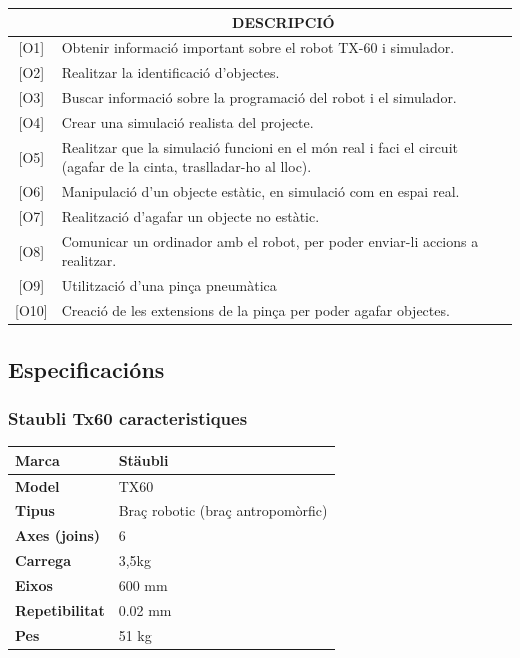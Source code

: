 ﻿\documentclass[10pt,a4paper,twocolumn,twoside]{article}
\begin{document}
\begin{table}[h]
\begin{tabular}{ | m{1.5cm} | m{6cm} | }
\hline
\rowcolor[HTML]{C0C0C0}
\multicolumn{1}{|c|}{\textbf{CODI}} 	& \multicolumn{1}{c|}{\textbf{DESCRIPCIÓ}} 									\\ \hline
\multicolumn{1}{|c|}{{[}O1{]}} 	& Obtenir informació important sobre el robot TX-60 i simulador.							\\ \hline
\multicolumn{1}{|c|}{{[}O2{]}} 	& Realitzar la identificació d’objectes. 											\\ \hline
\multicolumn{1}{|c|}{{[}O3{]}} 	& Buscar informació sobre la programació del robot i el simulador. 							\\ \hline
\multicolumn{1}{|c|}{{[}O4{]}} 	& Crear una simulació realista del projecte.										\\ \hline
\multicolumn{1}{|c|}{{[}O5{]}} 	& Realitzar que la simulació funcioni en el món real i faci el circuit (agafar de la cinta, traslladar-ho al lloc).	\\ \hline
\multicolumn{1}{|c|}{{[}O6{]}} 	& Manipulació d’un objecte estàtic, en simulació com en espai real.							\\ \hline
\multicolumn{1}{|c|}{{[}O7{]}} 	& Realització d’agafar un objecte no estàtic.										\\ \hline
\multicolumn{1}{|c|}{{[}O8{]}} 	& Comunicar un ordinador amb el robot, per poder enviar-li accions a realitzar.					\\ \hline
\multicolumn{1}{|c|}{{[}O9{]}} 	& Utilització d’una pinça pneumàtica											\\ \hline
\multicolumn{1}{|c|}{{[}O10{]}} 	& Creació de les extensions de la pinça per poder agafar objectes.							\\ \hline
\end{tabular}
\end{table}

\subsection{Especificacións}
\subsubsection{Staubli Tx60 caracteristiques}

\begin{table}[h]
\begin{tabular}{ |l|l| }
\hline
\textbf{Marca} 		& Stäubli 						\\ \hline
\textbf{Model} 		& TX60						\\ \hline
\textbf{Tipus} 		& Braç robotic (braç antropomòrfic) 		\\ \hline
\textbf{Axes (joins)} 	& 6 							\\ \hline
\textbf{Carrega}		&3,5kg						\\ \hline
\textbf{Eixos} 		& 600 mm						\\ \hline
\textbf{Repetibilitat} 	& 0.02 mm						\\ \hline
\textbf{Pes} 		& 51 kg						\\ \hline
\end{tabular}
\end{table}
\end{document}
